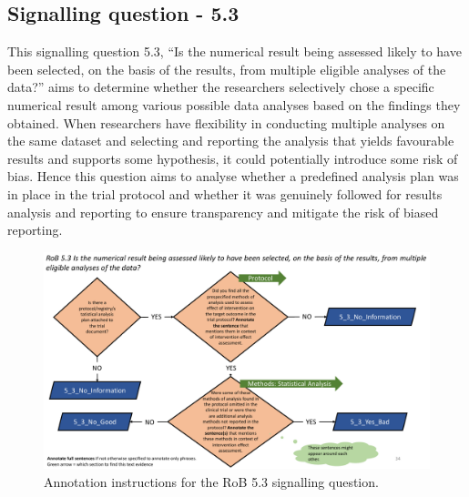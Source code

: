 \documentclass[sn-mathphys,Numbered]{sn-jnl}%
\begin{document}
\subsection*{Signalling question - 5.3 }
\label{subsec:5_3}
%
This signalling question 5.3, ``Is the numerical result being assessed likely to have been selected, on the basis of the results, from multiple eligible analyses of the data?'' aims to determine whether the researchers selectively chose a specific numerical result among various possible data analyses based on the findings they obtained.
When researchers have flexibility in conducting multiple analyses on the same dataset and selecting and reporting the analysis that yields favourable results and supports some hypothesis, it could potentially introduce some risk of bias.
Hence this question aims to analyse whether a predefined analysis plan was in place in the trial protocol and whether it was genuinely followed for results analysis and reporting to ensure transparency and mitigate the risk of biased reporting.


%
%
%
\begin{figure}[htbp]
    \centering
    \includegraphics[width=\textwidth]{figures/5_3.pdf}
    \caption{Annotation instructions for the RoB 5.3 signalling question.}
    \label{fig:5_3}
\end{figure}
%
%
%
\end{document}
